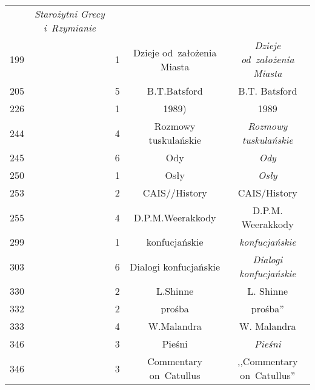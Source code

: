 \documentclass[a4paper,11pt]{article}
\begin{document}
\begin{center}
\begin{tabular}{|c|c|c|c|c|}
           & \emph{Starożytni Grecy i~Rzymianie} \\
    199 & &  1 & Dzieje od~założenia Miasta
           & \emph{Dzieje od~założenia Miasta} \\
    205 & &  5 & B.T.Batsford & B.T. Batsford \\
    226 & &  1 & 1989) & 1989 \\
    244 & &  4 & Rozmowy tuskulańskie
           & \emph{Rozmowy tuskulańskie} \\
    245 & &  6 & Ody & \emph{Ody} \\
    250 & &  1 & Osły & \emph{Osły} \\
    253 & &  2 & CAIS//History & CAIS/History \\
    255 & &  4 & D.P.M.Weerakkody & D.P.M. Weerakkody \\
    299 & &  1 & konfucjańskie & \emph{konfucjańskie} \\
    303 & &  6 & Dialogi konfucjańskie & \emph{Dialogi konfucjańskie} \\
    330 & &  2 & L.Shinne & L. Shinne \\
    332 & &  2 & prośba & prośba'' \\
    333 & &  4 & W.Malandra & W. Malandra \\
    346 & &  3 & Pieśni & \emph{Pieśni} \\
    346 & &  3 & Commentary on~Catullus & ,,Commentary on~Catullus'' \\
    \hline
  \end{tabular}


\end{center}
\end{document}

